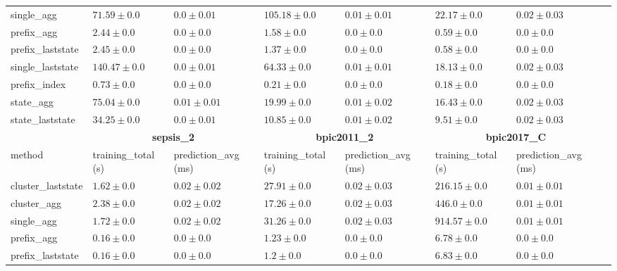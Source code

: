 \documentclass[twoside,11pt]{Latex/Classes/PhDthesisPSnPDF}
\begin{document}
\begin{table}[!htbp]
{\begin{tabular}{llllllll}
			single\_agg & $71.59 \pm 0.0$ & $\mathbf{0.0 \pm 0.01}$ & $105.18 \pm 0.0$ & $0.01 \pm 0.01$ & $22.17 \pm 0.0$ & $0.02 \pm 0.03$ \\ 
			prefix\_agg & $2.44 \pm 0.0$ & $\mathbf{0.0 \pm 0.0}$ & $1.58 \pm 0.0$ & $\mathbf{0.0 \pm 0.0}$ & $0.59 \pm 0.0$ & $\mathbf{0.0 \pm 0.0}$ \\ 
			prefix\_laststate & $2.45 \pm 0.0$ & $\mathbf{0.0 \pm 0.0}$ & $1.37 \pm 0.0$ & $\mathbf{0.0 \pm 0.0}$ & $0.58 \pm 0.0$ & $\mathbf{0.0 \pm 0.0}$ \\ 
			single\_laststate & $140.47 \pm 0.0$ & $\mathbf{0.0 \pm 0.01}$ & $64.33 \pm 0.0$ & $0.01 \pm 0.01$ & $18.13 \pm 0.0$ & $0.02 \pm 0.03$ \\ 
			prefix\_index & $\mathbf{0.73 \pm 0.0}$ & $\mathbf{0.0 \pm 0.0}$ & $\mathbf{0.21 \pm 0.0}$ & $\mathbf{0.0 \pm 0.0}$ & $\mathbf{0.18 \pm 0.0}$ & $\mathbf{0.0 \pm 0.0}$ \\ 
			state\_agg & $75.04 \pm 0.0$ & $0.01 \pm 0.01$ & $19.99 \pm 0.0$ & $0.01 \pm 0.02$ & $16.43 \pm 0.0$ & $0.02 \pm 0.03$ \\ 
			state\_laststate & $34.25 \pm 0.0$ & $\mathbf{0.0 \pm 0.01}$ & $10.85 \pm 0.0$ & $0.01 \pm 0.02$ & $9.51 \pm 0.0$ & $0.02 \pm 0.03$ \\ 
			\bottomrule
			\toprule
			& \multicolumn{2}{c}{{\bfseries sepsis\_2}} & \multicolumn{2}{c}{{\bfseries bpic2011\_2}} & \multicolumn{2}{c}{{\bfseries bpic2017\_C}} \\ \cmidrule(lr){2-3} \cmidrule(lr){4-5} \cmidrule(lr){6-7}
			method  & training\_total (s) & prediction\_avg (ms) & training\_total (s) & prediction\_avg (ms) & training\_total (s) & prediction\_avg (ms) \\ \midrule
			cluster\_laststate & $1.62 \pm 0.0$ & $0.02 \pm 0.02$ & $27.91 \pm 0.0$ & $0.02 \pm 0.03$ & $216.15 \pm 0.0$ & $0.01 \pm 0.01$ \\ 
			cluster\_agg & $2.38 \pm 0.0$ & $0.02 \pm 0.02$ & $17.26 \pm 0.0$ & $0.02 \pm 0.03$ & $446.0 \pm 0.0$ & $0.01 \pm 0.01$ \\ 
			single\_agg & $1.72 \pm 0.0$ & $0.02 \pm 0.02$ & $31.26 \pm 0.0$ & $0.02 \pm 0.03$ & $914.57 \pm 0.0$ & $0.01 \pm 0.01$ \\ 
			prefix\_agg & $0.16 \pm 0.0$ & $\mathbf{0.0 \pm 0.0}$ & $1.23 \pm 0.0$ & $\mathbf{0.0 \pm 0.0}$ & $6.78 \pm 0.0$ & $\mathbf{0.0 \pm 0.0}$ \\ 
			prefix\_laststate & $0.16 \pm 0.0$ & $\mathbf{0.0 \pm 0.0}$ & $1.2 \pm 0.0$ & $\mathbf{0.0 \pm 0.0}$ & $6.83 \pm 0.0$ & $\mathbf{0.0 \pm 0.0}$ \\ 

\end{tabular}}
\end{table}
\end{document}
